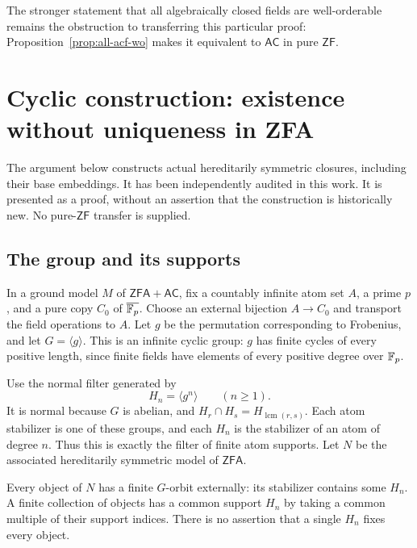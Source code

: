 \documentclass[11pt,a4paper]{article}
\theoremstyle{definition}\newtheorem{definition}[theorem]{Definition}
\theoremstyle{remark}\newtheorem{remark}[theorem]{Remark}
\newcommand{\ZF}{\mathsf{ZF}}\newcommand{\ZFA}{\mathsf{ZFA}}
\newcommand{\AC}{\mathsf{AC}}\newcommand{\BPI}{\mathsf{BPI}}
\begin{document}
The stronger statement that all algebraically closed fields are well-orderable remains the obstruction to transferring this particular proof: Proposition~\ref{prop:all-acf-wo} makes it equivalent to $\AC$ in pure $\ZF$.

\section{Cyclic construction: existence without uniqueness in ZFA}\label{sec:cyclic}
The argument below constructs actual hereditarily symmetric closures, including their base embeddings. It has been independently audited in this work. It is presented as a proof, without an assertion that the construction is historically new. No pure-$\ZF$ transfer is supplied.

\subsection{The group and its supports}
In a ground model $M$ of $\ZFA+\AC$, fix a countably infinite atom set $A$, a prime $p$, and a pure copy $C_0$ of $\overline{\mathbb F_p}$. Choose an external bijection $A\to C_0$ and transport the field operations to $A$. Let $g$ be the permutation corresponding to Frobenius, and let $G=\langle g\rangle$. This is an infinite cyclic group: $g$ has finite cycles of every positive length, since finite fields have elements of every positive degree over $\mathbb F_p$.

Use the normal filter generated by
\[
H_n=\langle g^n\rangle\qquad(n\geq1).
\]
It is normal because $G$ is abelian, and $H_r\cap H_s=H_{\operatorname{lcm}(r,s)}$. Each atom stabilizer is one of these groups, and each $H_n$ is the stabilizer of an atom of degree $n$. Thus this is exactly the filter of finite atom supports. Let $N$ be the associated hereditarily symmetric model of $\ZFA$.

Every object of $N$ has a finite $G$-orbit externally: its stabilizer contains some $H_n$. A finite collection of objects has a common support $H_n$ by taking a common multiple of their support indices. There is no assertion that a single $H_n$ fixes every object.
\end{document}
